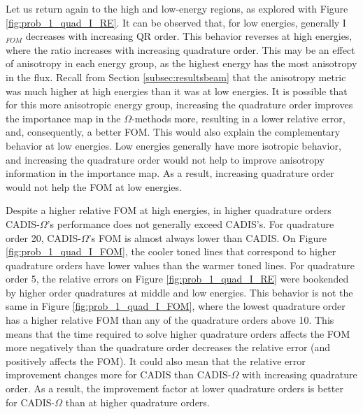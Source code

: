 Let us return again to the high and low-energy regions, as explored
with Figure \ref{fig:prob_1_quad_I_RE}. It can be observed
that, for low energies, generally I$_{FOM}$ decreases with increasing
QR order. This behavior reverses at high energies, where the ratio
increases with increasing quadrature order. This may be an effect of anisotropy
in each energy group, as the highest energy has the most anisotropy in the flux.
Recall from Section \ref{subsec:resultsbeam} that the anisotropy metric was much
higher at high energies than it was at low energies. It is possible that for
this more anisotropic energy group, increasing the quadrature order improves the
importance map in the $\Omega$-methods more, resulting in a lower relative
error, and, consequently, a better FOM.
This would also explain the complementary behavior at low energies. Low
energies generally have more isotropic behavior, and increasing the quadrature
order would not help to improve anisotropy information in the importance map.
As a result, increasing quadrature order would not help the FOM at low energies.

Despite a higher relative FOM at high energies, in higher quadrature orders
CADIS-$\Omega$'s performance does not generally exceed CADIS's. For quadrature
order 20, CADIS-$\Omega$'s FOM is almost always lower than CADIS. On Figure
\ref{fig:prob_1_quad_I_FOM}, the cooler toned lines that correspond to higher
quadrature orders have lower values than the warmer toned lines.
For quadrature order 5,
the relative errors on Figure \ref{fig:prob_1_quad_I_RE} were bookended by
higher order quadratures at middle and low energies. This behavior is not the
same in Figure \ref{fig:prob_1_quad_I_FOM}, where the lowest quadrature order
has a higher relative FOM than any of the quadrature orders above 10. This means
that the time required to solve higher quadrature orders affects the FOM more
negatively than the quadrature order decreases the relative error (and
positively affects the FOM). It could also mean that the relative error
improvement changes more for CADIS than CADIS-$\Omega$ with increasing
quadrature order. As a result, the improvement factor at lower quadrature orders
is better for CADIS-$\Omega$ than at higher quadrature orders.

%
%
%
%
%
%
%

